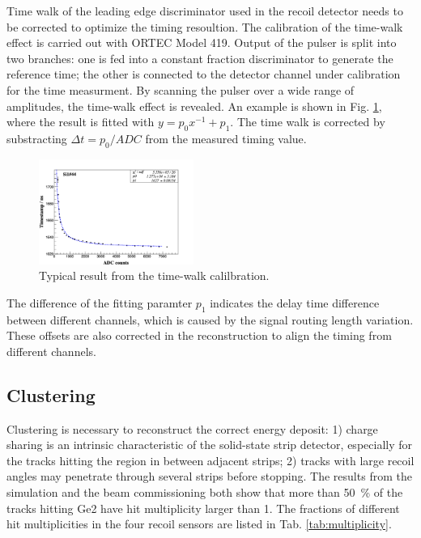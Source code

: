 \documentclass[number,5p]{elsarticle}
\begin{document}
Time walk of the leading edge discriminator used in the recoil detector needs to be corrected to
optimize the timing resoultion.
The calibration of the time-walk effect is carried out with ORTEC Model 419. 
Output of the pulser is split into two branches: one is fed into a constant fraction discriminator to generate the reference time;
the other is connected to the detector channel under calibration for the time measurment. 
By scanning the pulser over a wide range of amplitudes, the time-walk effect is revealed.
An example is shown in Fig. \ref{fig:timewalk}, where the result is fitted with \(y=p_0 x^{-1} + p_1\). 
The time walk is corrected by substracting \(\Delta t = p_0/ADC\) from the measured timing value.
\begin{figure}[htbp]
  \centering
  \includegraphics[width=0.45\textwidth]{./timewalk.png}
  \caption{Typical result from the time-walk calilbration.}
  \label{fig:timewalk}
\end{figure}

The difference of the fitting paramter \(p_1\) indicates the delay time
difference between different channels, which is caused by the signal routing length variation.
These offsets are also corrected in the reconstruction to align the timing from different channels.

\subsection{Clustering}
\label{clustering}

Clustering is necessary to reconstruct the correct energy deposit:
1) charge sharing is an intrinsic characteristic of the solid-state strip detector, especially
for the tracks hitting the region in between adjacent strips; 2) tracks with
large recoil angles may penetrate through several strips before stopping.
The results from the simulation and the beam commissioning both show that more than \SI{50}{\percent} of the tracks hitting Ge2 have hit multiplicity
larger than 1. The fractions of different hit multiplicities in the four
recoil sensors are listed in Tab. \ref{tab:multiplicity}.
\end{document}
